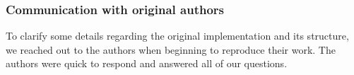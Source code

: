 \subsubsection*{Communication with original authors}


To clarify some details regarding the original implementation and its structure, we reached out to the authors when beginning to reproduce their work. The authors were quick to respond and answered all of our questions.
